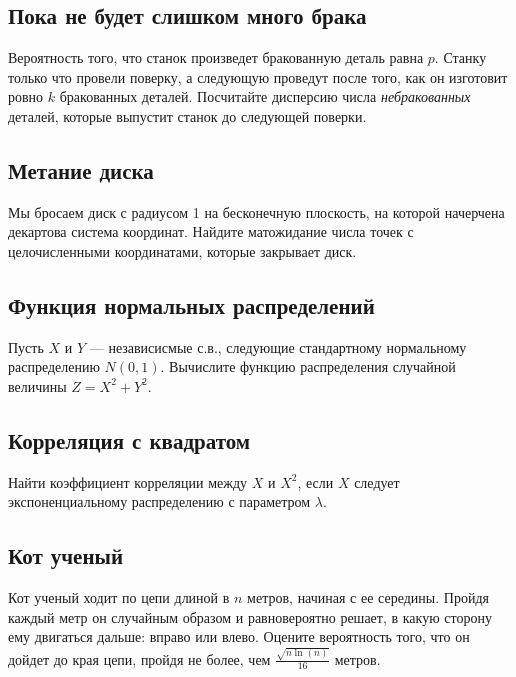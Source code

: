 \documentclass[12pt]{article}
\begin{document}
\subsection{Пока не будет слишком много брака}

Вероятность того, что станок произведет бракованную деталь равна $p$. Станку только что провели поверку, а следующую проведут после того, как он изготовит ровно $k$ бракованных деталей. Посчитайте дисперсию числа \emph{небракованных} деталей, которые выпустит станок до следующей поверки.



\subsection{Метание диска}

Мы бросаем диск с радиусом 1 на бесконечную плоскость, на которой начерчена декартова система координат. Найдите матожидание числа точек с целочисленными координатами, которые закрывает диск.



\subsection{Функция нормальных распределений}

Пусть $X$ и $Y$ --- независисмые с.в., следующие стандартному нормальному распределению $N(0, 1)$. Вычислите функцию распределения случайной величины $Z = X^2 + Y^2$.



\subsection{Корреляция с квадратом}

Найти коэффициент корреляции между $X$ и $X^2$, если $X$ следует экспоненциальному распределению с параметром $\lambda$.



\subsection{Кот ученый}

Кот ученый ходит по цепи длиной в $n$ метров, начиная с ее середины. Пройдя каждый метр он случайным образом и равновероятно решает, в какую сторону ему двигаться дальше: вправо или влево. Оцените вероятность того, что он дойдет до края цепи, пройдя не более, чем $\frac{\sqrt{n \ln(n)}}{16}$ метров.
\end{document}
